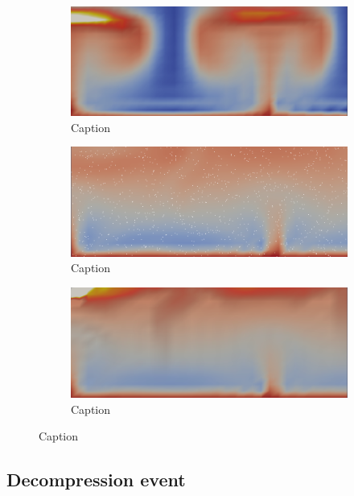 \begin{figure}
\begin{subfigure}{0.49\textwidth}
        \centering
        \includegraphics[width=\textwidth]{figures/box_2pp38.png}
        \caption{Caption}
        \label{fig:my_label}
    \end{subfigure}
    \begin{subfigure}{0.49\textwidth}
        \centering
        \includegraphics[width=\textwidth]{figures/box_batch79.png}
        \caption{Caption}
        \label{fig:my_label}
    \end{subfigure}
    \hfill
    \begin{subfigure}{0.49\textwidth}
        \centering
        \includegraphics[width=\textwidth]{figures/box_2pp77.png}
        \caption{Caption}
        \label{fig:my_label}
    \end{subfigure}
\end{figure}
\subsection{Decompression event}

